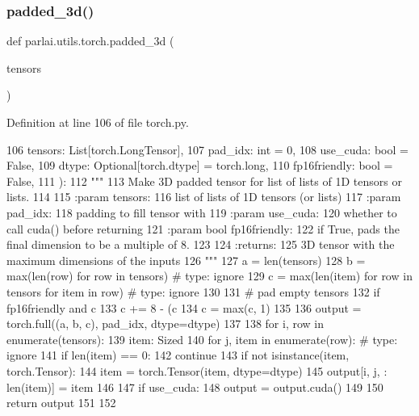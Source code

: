 \subsubsection{\texorpdfstring{padded\+\_\+3d()}{padded\_3d()}}
{\footnotesize\ttfamily def parlai.\+utils.\+torch.\+padded\+\_\+3d (\begin{DoxyParamCaption}\item[{}]{tensors }\end{DoxyParamCaption})}



Definition at line 106 of file torch.\+py.


\begin{DoxyCode}
106     tensors: List[torch.LongTensor],
107     pad\_idx: int = 0,
108     use\_cuda: bool = \textcolor{keyword}{False},
109     dtype: Optional[torch.dtype] = torch.long,
110     fp16friendly: bool = \textcolor{keyword}{False},
111 ):
112     \textcolor{stringliteral}{"""}
113 \textcolor{stringliteral}{    Make 3D padded tensor for list of lists of 1D tensors or lists.}
114 \textcolor{stringliteral}{}
115 \textcolor{stringliteral}{    :param tensors:}
116 \textcolor{stringliteral}{        list of lists of 1D tensors (or lists)}
117 \textcolor{stringliteral}{    :param pad\_idx:}
118 \textcolor{stringliteral}{        padding to fill tensor with}
119 \textcolor{stringliteral}{    :param use\_cuda:}
120 \textcolor{stringliteral}{        whether to call cuda() before returning}
121 \textcolor{stringliteral}{    :param bool fp16friendly:}
122 \textcolor{stringliteral}{        if True, pads the final dimension to be a multiple of 8.}
123 \textcolor{stringliteral}{}
124 \textcolor{stringliteral}{    :returns:}
125 \textcolor{stringliteral}{        3D tensor with the maximum dimensions of the inputs}
126 \textcolor{stringliteral}{    """}
127     a = len(tensors)
128     b = max(len(row) \textcolor{keywordflow}{for} row \textcolor{keywordflow}{in} tensors)  \textcolor{comment}{# type: ignore}
129     c = max(len(item) \textcolor{keywordflow}{for} row \textcolor{keywordflow}{in} tensors \textcolor{keywordflow}{for} item \textcolor{keywordflow}{in} row)  \textcolor{comment}{# type: ignore}
130 
131     \textcolor{comment}{# pad empty tensors}
132     \textcolor{keywordflow}{if} fp16friendly \textcolor{keywordflow}{and} c %
133         c += 8 - (c %
134     c = max(c, 1)
135 
136     output = torch.full((a, b, c), pad\_idx, dtype=dtype)
137 
138     \textcolor{keywordflow}{for} i, row \textcolor{keywordflow}{in} enumerate(tensors):
139         item: Sized
140         \textcolor{keywordflow}{for} j, item \textcolor{keywordflow}{in} enumerate(row):  \textcolor{comment}{# type: ignore}
141             \textcolor{keywordflow}{if} len(item) == 0:
142                 \textcolor{keywordflow}{continue}
143             \textcolor{keywordflow}{if} \textcolor{keywordflow}{not} isinstance(item, torch.Tensor):
144                 item = torch.Tensor(item, dtype=dtype)
145             output[i, j, : len(item)] = item
146 
147     \textcolor{keywordflow}{if} use\_cuda:
148         output = output.cuda()
149 
150     \textcolor{keywordflow}{return} output
151 
152 
\end{DoxyCode}

